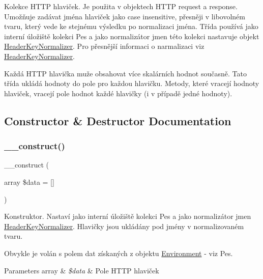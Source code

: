 Kolekce H\+T\+TP hlaviček. Je použita v objektech H\+T\+TP request a response. Umožňuje zadávat jména hlaviček jako case insensitive, přesněji v libovolném tvaru, který vede ke stejnému výsledku po normalizaci jména. Třída používá jako interní úložiště kolekci Pes a jako normalizátor jmen této kolekci nastavuje objekt \mbox{\hyperlink{class_pes_1_1_http_1_1_header_key_normalizer}{Header\+Key\+Normalizer}}. Pro přesnější informaci o narmalizaci viz \mbox{\hyperlink{class_pes_1_1_http_1_1_header_key_normalizer}{Header\+Key\+Normalizer}}.

Každá H\+T\+TP hlavička muže obsahovat více skalárních hodnot současně. Tato třída ukládá hodnoty do pole pro každou hlavičku. Metody, které vracejí hodnoty hlaviček, vracejí pole hodnot každé hlavičky (i v případě jedné hodnoty). 

\subsection{Constructor \& Destructor Documentation}
\mbox{\label{class_pes_1_1_http_1_1_headers_aa02306a5f1b8f5dff3b54dd510fd00af}} 
\subsubsection{\texorpdfstring{\+\_\+\+\_\+construct()}{\_\_construct()}}
{\footnotesize\ttfamily \+\_\+\+\_\+construct (\begin{DoxyParamCaption}\item[{array}]{\$data = {\ttfamily \mbox{[}\mbox{]}} }\end{DoxyParamCaption})}

Konstruktor. Nastaví jako interní úložiště kolekci Pes a jako normalizátor jmen \mbox{\hyperlink{class_pes_1_1_http_1_1_header_key_normalizer}{Header\+Key\+Normalizer}}. Hlavičky jsou ukládány pod jmény v normalizovaném tvaru.

Obvykle je volán s polem dat získaných z objektu \mbox{\hyperlink{class_pes_1_1_http_1_1_environment}{Environment}} -\/ viz Pes.


\begin{DoxyParams}[1]{Parameters}
array & {\em \$data} & Pole H\+T\+TP hlaviček \\
\hline
\end{DoxyParams}


